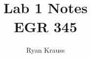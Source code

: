 \documentclass[t,12pt,aspectratio=169]{beamer}
\author{Ryan Krauss}
\institute{GVSU}
\begin{document}
\title[Lab 1 Notes]{Lab 1 Notes
  \label{lab-1-notes}%
    \\ %
    \large{EGR 345}%
    \label{egr-345}
  }
\author[Dr. Ryan Krauss]{}
\date{}
\maketitle


\end{document}
